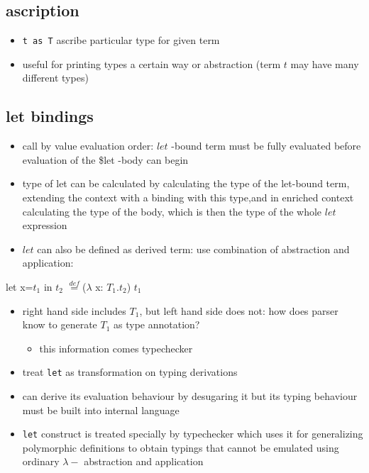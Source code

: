 \documentclass[11pt]{article}
\begin{document}
\subsection{ascription}
\label{sec:org8389fe7}
\begin{itemize}
\item \texttt{t as T} ascribe particular type for given term
\item useful for printing types a certain way or abstraction (term \(t\) may have many different types)
\end{itemize}

\subsection{let bindings}
\label{sec:org8dd1eb1}
\begin{itemize}
\item call by value evaluation order: \(let\) -bound term must be fully evaluated before evaluation of the \$let -body can begin
\item type of let can be calculated by calculating the type of the let-bound term, extending the context with a binding with this type,and in enriched context calculating the type of the body, which is then the type of the whole \(let\) expression
\item \(let\) can also be defined as derived term: use combination of abstraction and application:
\end{itemize}

let x=\(t_1\) in \(t_2\) \(\stackrel{def}{=}\)(\(\lambda\) x: \(T_1\).\(t_2\)) \(t_1\)

\begin{itemize}
\item right hand side includes \(T_1\), but left hand side does not: how does parser know to generate \(T_1\) as type annotation?
\begin{itemize}
\item this information comes typechecker
\end{itemize}
\item treat \texttt{let} as transformation on typing derivations
\item can derive its evaluation behaviour by desugaring it but its typing behaviour must be built into internal language
\item \texttt{let} construct is treated specially by typechecker which uses it for generalizing polymorphic definitions to obtain typings that cannot be emulated using ordinary \(\lambda-\) abstraction and application
\end{itemize}
\end{document}
